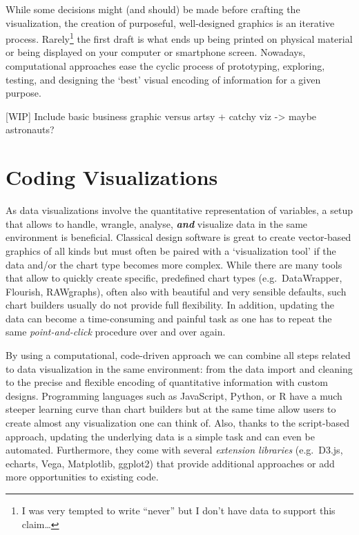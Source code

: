 \documentclass[
]{krantz}
\begin{document}
While some decisions might (and should) be made before crafting the visualization, the creation of purposeful, well-designed graphics is an iterative process. Rarely\footnote{I was very tempted to write ``never'' but I don't have data to support this claim\ldots{}} the first draft is what ends up being printed on physical material or being displayed on your computer or smartphone screen. Nowadays, computational approaches ease the cyclic process of prototyping, exploring, testing, and designing the `best' visual encoding of information for a given purpose.

{[}WIP{]} Include basic business graphic versus artsy + catchy viz -\textgreater{} maybe astronauts?

\hypertarget{coding}{%
\section{Coding Visualizations}\label{coding}}

As data visualizations involve the quantitative representation of variables, a setup that allows to handle, wrangle, analyse, \textbf{\emph{and}} visualize data in the same environment is beneficial. Classical design software is great to create vector-based graphics of all kinds but must often be paired with a `visualization tool' if the data and/or the chart type becomes more complex. While there are many tools that allow to quickly create specific, predefined chart types (e.g.~DataWrapper, Flourish, RAWgraphs), often also with beautiful and very sensible defaults, such chart builders usually do not provide full flexibility. In addition, updating the data can become a time-consuming and painful task as one has to repeat the same \emph{point-and-click} procedure over and over again.

By using a computational, code-driven approach we can combine all steps related to data visualization in the same environment: from the data import and cleaning to the precise and flexible encoding of quantitative information with custom designs. Programming languages such as JavaScript, Python, or R have a much steeper learning curve than chart builders but at the same time allow users to create almost any visualization one can think of. Also, thanks to the script-based approach, updating the underlying data is a simple task and can even be automated. Furthermore, they come with several \emph{extension libraries} (e.g.~D3.js, echarts, Vega, Matplotlib, ggplot2) that provide additional approaches or add more opportunities to existing code.
\end{document}
